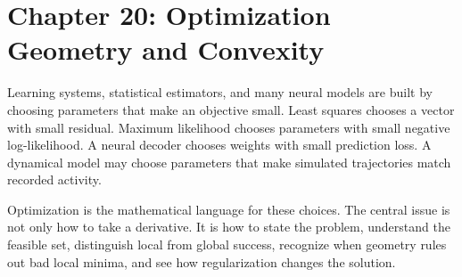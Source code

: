 \section{Chapter 20: Optimization Geometry and Convexity}
\label{ch:optimization-geometry-convexity}

Learning systems, statistical estimators, and many neural models are built by choosing parameters that make an objective small. Least squares chooses a vector with small residual. Maximum likelihood chooses parameters with small negative log-likelihood. A neural decoder chooses weights with small prediction loss. A dynamical model may choose parameters that make simulated trajectories match recorded activity.

Optimization is the mathematical language for these choices. The central issue is not only how to take a derivative. It is how to state the problem, understand the feasible set, distinguish local from global success, recognize when geometry rules out bad local minima, and see how regularization changes the solution.

